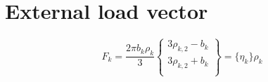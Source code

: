 \section*{External load vector}
\begin{equation}\label{eqn:flexMatrix}
    {F_k}=
    \frac{2\pi b_k\rho_k}{3}
    \left\{\begin{matrix}
        3\rho_{k,2}-b_k \\[2ex]
        3\rho_{k,2}+b_k \\[2ex]
    \end{matrix}\right\}
    =
    \{\eta_k\}\rho_k
\end{equation}